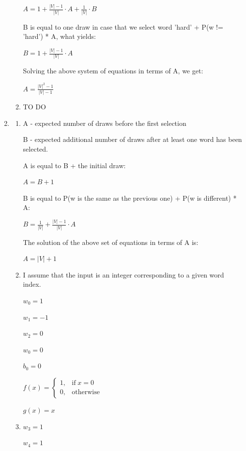 \documentclass{article}
\begin{document}
\begin{enumerate}[label = (\alph*)]
\begin{enumerate}[label = (\roman*)]
	$A = 1 + \frac{|V|-1}{|V|} \cdot A + \frac{1}{|V|} \cdot B$   
	
	B is equal to one draw in case that we select word 'hard' + P(w != 'hard') * A, what yields: 
	
	$B = 1 + \frac{|V|-1}{|V|} \cdot A$
	
	Solving the above system of equations in terms of A, we get:
	
	$A = \frac{|V|^2-1}{|V|-1}$ 
    
    \item
    TO DO
    
	\end{enumerate}
	
	\item
    \begin{enumerate}[label = (\roman*)]
    \item
    A - expected number of draws before the first selection
    
    B - expected additional number of draws after at least one word has been selected.
    
    A is equal to B + the initial draw:
    
    $A=B+1$
    
    B is equal to P(w is the same as the previous one) + P(w is different) * A:
    
    $B = \frac{1}{|V|} + \frac{|V|-1}{|V|} \cdot A$
    
    The solution of the above set of equations in terms of A is:
    
    $A = |V|+1$
    
    \item
    I assume that the input is an integer corresponding to a given word index.
    
    $w_0=1$
    
    $w_1=-1$
    
    $w_2=0$
    
    $w_0=0$
    
    $b_0=0$
    
    $f(x)=\begin{cases}
      1, & \text{if} \; x=0\\
      0, & \text{otherwise}
    \end{cases}$
    
    $g(x) = x$
    
    \item
    $w_3=1$
    
    $w_4=1$
    

\end{enumerate}
\end{enumerate}
\end{document}
